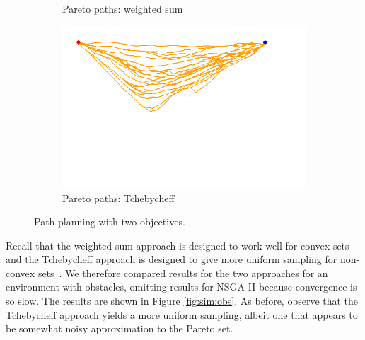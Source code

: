 \documentclass{article}
\begin{document}
\begin{figure}[h!]
\begin{subfigure}[b]{0.29\linewidth}
		\caption{Pareto paths: weighted sum}
		\label{fig:sim:norm:sols:b}
	\end{subfigure} 
	\begin{subfigure}[b]{0.29\linewidth}
		\centering
		\includegraphics[width=\textwidth]{fig/sim2-2obj/MORRTstar00-ALL.png}
		\caption{Pareto paths: Tchebycheff}
		\label{fig:sim:norm:sols:c}
	\end{subfigure}
	\caption{Path planning with two objectives.}
	\label{fig:sim:norm}
\end{figure}

Recall that the weighted sum approach is designed to work well for convex sets and the Tchebycheff approach is designed to give more uniform sampling for non-convex sets~\cite{4358754}. 
We therefore compared results for the two approaches for an environment with obstacles, omitting results for NSGA-II because convergence is so slow.  
The results are shown in Figure \ref{fig:sim:obs}.
As before, observe that the Tchebycheff approach yields a more uniform sampling, albeit one that appears to be somewhat noisy approximation to the Pareto set.
\end{document}
